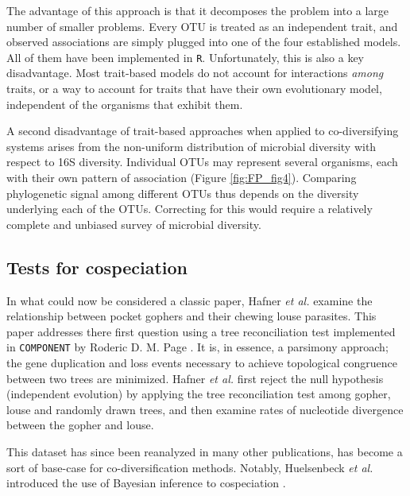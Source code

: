 The advantage of this approach is that it decomposes the problem into a large number of smaller problems. Every OTU is treated as an independent trait, and observed associations are simply plugged into one of the four established models. All of them have been implemented in {\tt R}. Unfortunately, this is also a key disadvantage. Most trait-based models do not account for interactions {\em among} traits, or a way to account for traits that have their own evolutionary model, independent of the organisms that exhibit them. 

A second disadvantage of trait-based approaches when applied to co-diversifying systems arises from the non-uniform distribution of microbial diversity with respect to 16S diversity. Individual OTUs may represent several organisms, each with their own pattern of association (Figure \ref{fig:FP_fig4}). Comparing phylogenetic signal among different OTUs thus depends on the diversity underlying each of the OTUs. Correcting for this would require a relatively complete and unbiased survey of microbial diversity.



\subsection{Tests for cospeciation}

In what could now be considered a classic paper, Hafner {\em et al.} \cite{hafner1994disparate} examine the relationship between pocket gophers and their chewing louse parasites. This paper addresses there first question using a tree reconciliation test implemented in {\tt COMPONENT} by Roderic D. M. Page \cite{page1993genes}. It is, in essence, a parsimony approach; the gene duplication and loss events necessary to achieve topological congruence between two trees are minimized. Hafner {\em et al.} first reject the null hypothesis (independent evolution) by applying the tree reconciliation test among gopher, louse and randomly drawn trees, and then examine rates of nucleotide divergence between the gopher and louse. 

This dataset has since been reanalyzed in many other publications, has become a sort of base-case for co-diversification methods. Notably, Huelsenbeck {\em et al.} introduced the use of Bayesian inference to cospeciation \cite{huelsenbeck2000bayesian}.

